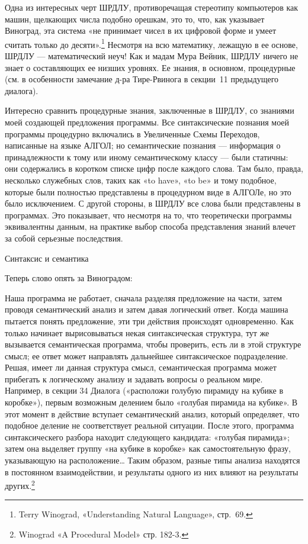 \documentclass[../main.tex]{subfiles}
\begin{document}
Одна из интересных черт ШРДЛУ, противоречащая стереотипу компьютеров как машин, щелкающих числа подобно орешкам, это то, что, как указывает Виноград, эта система «не принимает чисел в их цифровой форме и умеет считать только до десяти».\footnote{Terry Winograd, «Understanding Natural Language», стр.~69.} Несмотря на всю математику, лежащую в ее основе, ШРДЛУ --- математический неуч! Как и мадам Мура Вейник, ШРДЛУ ничего не знает о составляющих ее низших уровнях. Ее знания, в основном, процедурные (см. в особенности замечание д-ра Тире-Рвинога в секции~11 предыдущего диалога).

Интересно сравнить процедурные знания, заключенные в ШРДЛУ, со знаниями моей создающей предложения программы. Все синтаксические познания моей программы процедурно включались в Увеличенные Схемы Переходов, написанные на языке АЛГОЛ; но семантические познания --- информация о принадлежности к тому или иному семантическому классу --- были статичны: они содержались в коротком списке цифр после каждого слова. Там было, правда, несколько служебных слов, таких как «to have», «to be» и тому подобное, которые были полностью представлены в процедурном виде в АЛГОЛе, но это было исключением. С другой стороны, в ШРДЛУ все слова были представлены в программах. Это показывает, что несмотря на то, что теоретически программы эквивалентны данным, на практике выбор способа представления знаний влечет за собой серьезные последствия.

Синтаксис и семантика

Теперь слово опять за Виноградом:

Наша программа не работает, сначала разделяя предложение на части, затем проводя семантический анализ и затем давая логический ответ. Когда машина пытается понять предложение, эти три действия происходят одновременно. Как только начинает вырисовываться некая синтаксическая структура, тут же вызывается семантическая программа, чтобы проверить, есть ли в этой структуре смысл; ее ответ может направлять дальнейшее синтаксическое подразделение. Решая, имеет ли данная структура смысл, семантическая программа может прибегать к логическому анализу и задавать вопросы о реальном мире. Например, в секции 34 Диалога («расположи голубую пирамиду на кубике в коробке»), первым возможным делением было «голубая пирамида на кубике». В этот момент в действие вступает семантический анализ, который определяет, что подобное деление не соответствует реальной ситуации. После этого, программа синтаксическего разбора находит следующего кандидата: «голубая пирамида»; затем она выделяет группу «на кубике в коробке» как самостоятельную фразу, указывающую на расположение\ldots{} Таким образом, разные типы анализа находятся в постоянном взаимодействии, и результаты одного из них влияют на результаты других.\footnote{Winograd «A Procedural Model» стр. 182-3.}
\end{document}
